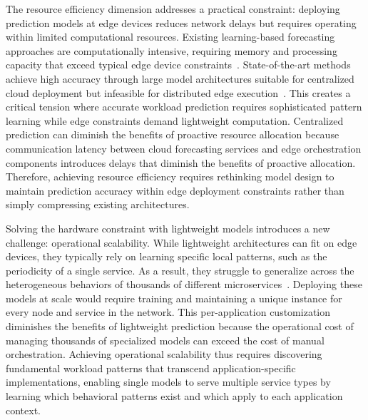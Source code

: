 The resource efficiency dimension addresses a practical constraint: deploying prediction models at edge devices reduces network delays but requires operating within limited computational resources. Existing learning-based forecasting approaches are computationally intensive, requiring memory and processing capacity that exceed typical edge device constraints~\cite{kong2022edge, 8334540, 9500858}. State-of-the-art methods achieve high accuracy through large model architectures suitable for centralized cloud deployment but infeasible for distributed edge execution~\cite{meuser2024revisiting}. This creates a critical tension where accurate workload prediction requires sophisticated pattern learning while edge constraints demand lightweight computation. Centralized prediction can diminish the benefits of proactive resource allocation because communication latency between cloud forecasting services and edge orchestration components introduces delays that diminish the benefits of proactive allocation. Therefore, achieving resource efficiency requires rethinking model design to maintain prediction accuracy within edge deployment constraints rather than simply compressing existing architectures.

Solving the hardware constraint with lightweight models introduces a new challenge: operational scalability. While lightweight architectures can fit on edge devices, they typically rely on learning specific local patterns, such as the periodicity of a single service. As a result, they struggle to generalize across the heterogeneous behaviors of thousands of different microservices~\cite{zou2024generalization}. Deploying these models at scale would require training and maintaining a unique instance for every node and service in the network. This per-application customization diminishes the benefits of lightweight prediction because the operational cost of managing thousands of specialized models can exceed the cost of manual orchestration. Achieving operational scalability thus requires discovering fundamental workload patterns that transcend application-specific implementations, enabling single models to serve multiple service types by learning which behavioral patterns exist and which apply to each application context.

